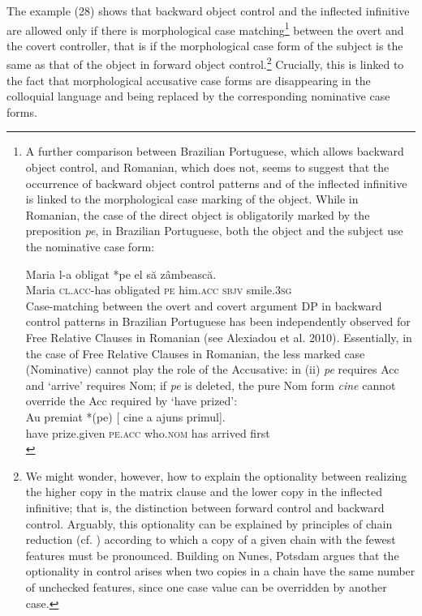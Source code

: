 \documentclass[output=paper]{langsci/langscibook}
\begin{document}
The example (28) shows that backward object control and the inflected infinitive are allowed only if there is morphological case matching\footnote{A further comparison between Brazilian Portuguese, which allows backward object control, and Romanian, which does not, seems to suggest that the occurrence of backward object control patterns and of the inflected infinitive is linked to the morphological case marking of the object. While in Romanian, the case of the direct object is obligatorily marked by the preposition \textit{pe}, in Brazilian Portuguese, both the object and the subject use the nominative case form: 

\ea\gll * Maria  l-a     obligat     *pe el            să      zâmbească.\\
        {} Maria  \textsc{cl.acc}{}-has        obligated     \textsc{pe} him\textsc{.acc} \textsc{sbjv} smile\textsc{{}.3sg}\\
\z
Case-matching between the overt and covert argument DP in backward control patterns in Brazilian Portuguese has been independently observed for Free Relative Clauses in Romanian (see Alexiadou et al. 2010). Essentially, in the case of Free Relative Clauses in Romanian, the less marked case (Nominative) cannot play the role of the Accusative: in (ii) \textit{pe} requires Acc and ‘arrive’ requires Nom; if \textit{pe} is deleted, the pure Nom form \textit{cine} cannot override the Acc required by ‘have prized’: 
\ea \citep{Alexiadou2010}\\\gll  Au    premiat       *(pe)     [ cine        a     ajuns    primul].\\
have prize.given   \textsc{pe.acc} {}  who.\textsc{nom} has arrived first\\
\z} between the overt and the covert controller, that is if the morphological case form of the subject is the same as that of the object in forward object control.\footnote{We might wonder, however, how to explain the optionality between realizing the higher copy in the matrix clause and the lower copy in the inflected infinitive; that is, the distinction between forward control and backward control. Arguably, this optionality can be explained by principles of chain reduction (cf. \citealt{Nunes2004}) according to which a copy of a given chain with the fewest features must be pronounced. Building on Nunes, Potsdam argues that the optionality in control arises when two copies in a chain have the same number of unchecked features, since one case value can be overridden by another case.} Crucially, this is linked to the fact that morphological accusative case forms are disappearing in the colloquial language and being replaced by the corresponding nominative case forms.
\end{document}
